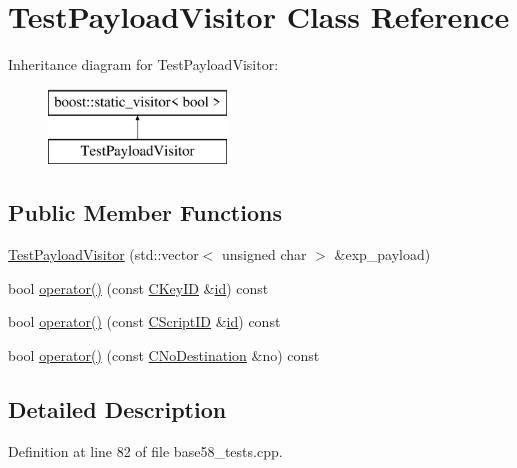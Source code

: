 \hypertarget{class_test_payload_visitor}{}\section{Test\+Payload\+Visitor Class Reference}
\label{class_test_payload_visitor}
Inheritance diagram for Test\+Payload\+Visitor\+:\begin{figure}[H]
\begin{center}
\leavevmode
\includegraphics[height=2.000000cm]{class_test_payload_visitor}
\end{center}
\end{figure}
\subsection*{Public Member Functions}
\begin{DoxyCompactItemize}
\item 
\hyperlink{class_test_payload_visitor_a8f963dfce22edb3c83c5712f4a9fa64d}{Test\+Payload\+Visitor} (std\+::vector$<$ unsigned char $>$ \&exp\+\_\+payload)
\item 
bool \hyperlink{class_test_payload_visitor_a696edf0b12cc446b448ab676dfc6fc78}{operator()} (const \hyperlink{class_c_key_i_d}{C\+Key\+I\+D} \&\hyperlink{db__test_8cc_a7441ef0865bcb3db9b8064dd7375c1ea}{id}) const 
\item 
bool \hyperlink{class_test_payload_visitor_a8ff11d72e4866f6ae023e3ce23830454}{operator()} (const \hyperlink{class_c_script_i_d}{C\+Script\+I\+D} \&\hyperlink{db__test_8cc_a7441ef0865bcb3db9b8064dd7375c1ea}{id}) const 
\item 
bool \hyperlink{class_test_payload_visitor_ae7023a445384bfb2602f5fbdb6bba932}{operator()} (const \hyperlink{class_c_no_destination}{C\+No\+Destination} \&no) const 
\end{DoxyCompactItemize}


\subsection{Detailed Description}


Definition at line 82 of file base58\+\_\+tests.\+cpp.



